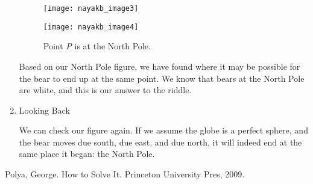 \begin{enumerate}
\renewcommand{\thefigure}{4}
\begin{figure}[!htb]
   \begin{minipage}{0.48\textwidth}
     \centering
     \texttt{[image: nayakb\_image3]}
     \caption{Point \emph{P} is 1 mile north of the South Pole.}\label{Fig:Data1}
   \end{minipage}\hfill
   \begin{minipage}{0.48\textwidth}
     \centering
     \renewcommand{\thefigure}{5}
     \texttt{[image: nayakb\_image4]}
     \caption{Point \emph{P} is at the North Pole.}\label{Fig:Data2}
   \end{minipage}
\end{figure}


\pagebreak
   Based on our North Pole figure, we have found where it may be possible for the bear to end up at the same point. We know that bears at the North Pole are white, and this is our answer to the riddle.

 
   
   \item Looking Back
   
   We can check our figure again. If we assume the globe is a perfect sphere, and the bear moves due south, due east, and due north, it will indeed end at the same place it began: the North Pole.
   
\end{enumerate}


\begin{thebibliography}{1}

\bibitem{} 
Polya, George. How to Solve It. Princeton University Pres, 2009.

\end{thebibliography}
